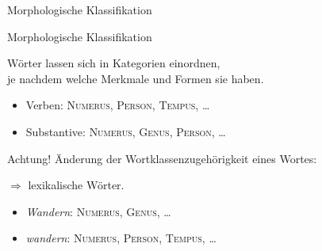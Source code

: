 \begin{frame}
  {Morphologische Klassifikation}
  \pause
  \begin{exe}
    \ex
    \begin{xlist}
        \pause
    \end{xlist}
        \pause
    \ex
    \begin{xlist}
        \pause
        \pause
    \end{xlist}
  \end{exe}
\end{frame}

\begin{frame}
  {Morphologische Klassifikation}
  \pause
  \begin{center}
    \Large Wörter lassen sich in Kategorien einordnen,\\
    je nachdem \alert{welche Merkmale und Formen sie haben}.
  \end{center}
  \Zeile
  \pause
  \begin{itemize}[<+->]
    \item Verben: \textsc{Numerus}, \textsc{Person}, \textsc{Tempus}, \ldots
    \item Substantive: \textsc{Numerus}, \textsc{Genus}, \textsc{Person}, \ldots
  \end{itemize}
\end{frame}

\begin{frame}
  {Achtung!}
  \pause
  \alert{Änderung der Wortklassenzugehörigkeit} eines Wortes:
  \pause
  \Zeile
  \begin{exe}
    \ex\label{ex:paradigmatischeklassifikation017}\begin{xlist}
      \pause
    \end{xlist}
  \end{exe}
  \pause
  \Zeile
  $\Rightarrow$  lexikalische Wörter.
  \pause
  \begin{itemize}[<+->]
    \item \textit{Wandern}: \textsc{Numerus}, \textsc{Genus}, \ldots
    \item \textit{wandern}: \textsc{Numerus}, \textsc{Person}, \textsc{Tempus}, \ldots
  \end{itemize}
\end{frame}


